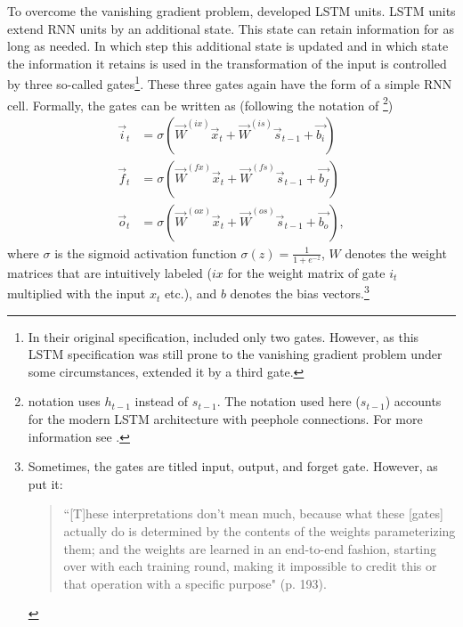 To overcome the vanishing gradient problem, \citet{Hochreiter:1997} developed LSTM units. LSTM units extend RNN units by an additional state. This state can retain information for as long as needed. In which step this additional state is updated and in which state the information it retains is used in the transformation of the input is controlled by three so-called gates\footnote{In their original specification, \citet{Hochreiter:1997} included only two gates. However, as this LSTM specification was still prone to the vanishing gradient problem under some circumstances, \citet{Gers:2000} extended it by a third gate.}. These three gates again have the form of a simple RNN cell. Formally, the gates can be written as (following the notation of \citet{Lipton:2015}\footnote{\cites{Lipton:2015} notation uses $h_{t-1}$ instead of $s_{t-1}$. The notation used here ($s_{t-1}$) accounts for the modern LSTM architecture with peephole connections. For more information see \cite{Gers:2002}.})
%
\begin{equation} \label{Eq:LSTMgates}
\begin{split}
    \vec{i}_t&=\sigma\left(\vec{W}^{(ix)}\vec{x}_t+\vec{W}^{(is)}\vec{s}_{t-1}+\vec{b_i}\right)\\
    \vec{f}_t&=\sigma\left(\vec{W}^{(fx)}\vec{x}_t+\vec{W}^{(fs)}\vec{s}_{t-1}+\vec{b_f}\right)\\
    \vec{o}_t&=\sigma\left(\vec{W}^{(ox)}\vec{x}_t+\vec{W}^{(os)}\vec{s}_{t-1}+\vec{b_o}\right),
\end{split}   
\end{equation}
%
where $\sigma$ is the sigmoid activation function $\sigma(z)=\frac{1}{1+e^{-z}}$, $W$ denotes the weight matrices that are intuitively labeled ($ix$ for the weight matrix of gate $i_t$ multiplied with the input $x_t$ etc.), and $b$ denotes the bias vectors.\footnote{Sometimes, the gates are titled input, output, and forget gate. However, as \citet{chollet:2018} put it:
\vspace{0.75\dimexpr-\topsep-\partopsep}
\begin{quote}
    ``[T]hese interpretations don’t mean much, because what these [gates] actually do is determined by the contents of the weights parameterizing them; and the weights are learned in an end-to-end fashion, starting over with each training round, making it impossible to credit this or that operation with a specific purpose" (p. 193).
\end{quote}\vspace{\dimexpr-\topsep-\partopsep}
}

